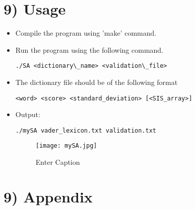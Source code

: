 \documentclass[a4paper,11pt]{article}
\theoremstyle{mytheor}
\begin{document}
\section*{9) Usage}
\begin{itemize}
    \item Compile the program using 'make' command.
    \item Run the program using the following command.
    \begin{lstlisting}[label={list:ninth},caption=Run]
    ./SA <dictionary\_name> <validation\_file>
    \end{lstlisting}
    \item The dictionary file should be of the following format
    \begin{lstlisting}[label={list:tenth},caption=Dictionary format]
     <word> <score> <standard_deviation> [<SIS_array>]
    \end{lstlisting}
    \item Output:
    \begin{lstlisting}[label={list:eleventh},caption=Output Example]
     ./mySA vader_lexicon.txt validation.txt
    \end{lstlisting}
    \begin{figure}
    \centering
    \texttt{[image: mySA.jpg]}
    \caption{Enter Caption}
    \label{fig:enter-label}
    \end{figure}
\end{itemize}


\section*{9) Appendix}
\end{document}
